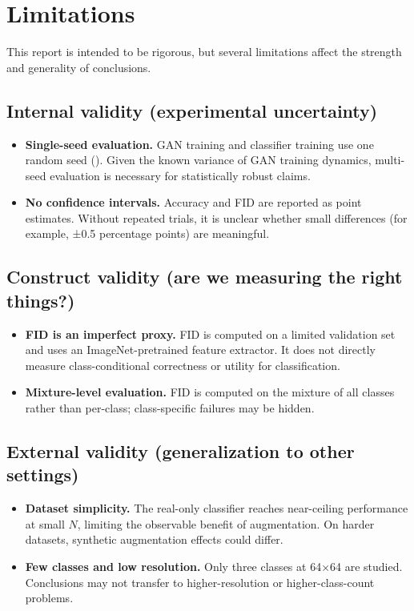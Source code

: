 \section{Limitations}

This report is intended to be rigorous, but several limitations affect the strength and generality of conclusions.

\subsection{Internal validity (experimental uncertainty)}

\begin{itemize}
\item \textbf{Single-seed evaluation.} GAN training and classifier training use one random seed (). Given the known variance of GAN training dynamics, multi-seed evaluation is necessary for statistically robust claims.
\item \textbf{No confidence intervals.} Accuracy and FID are reported as point estimates. Without repeated trials, it is unclear whether small differences (for example, ±0.5 percentage points) are meaningful.
\end{itemize}

\subsection{Construct validity (are we measuring the right things?)}

\begin{itemize}
\item \textbf{FID is an imperfect proxy.} FID is computed on a limited validation set and uses an ImageNet-pretrained feature extractor. It does not directly measure class-conditional correctness or utility for classification.
\item \textbf{Mixture-level evaluation.} FID is computed on the mixture of all classes rather than per-class; class-specific failures may be hidden.
\end{itemize}

\subsection{External validity (generalization to other settings)}

\begin{itemize}
\item \textbf{Dataset simplicity.} The real-only classifier reaches near-ceiling performance at small \(N\), limiting the observable benefit of augmentation. On harder datasets, synthetic augmentation effects could differ.
\item \textbf{Few classes and low resolution.} Only three classes at 64×64 are studied. Conclusions may not transfer to higher-resolution or higher-class-count problems.
\end{itemize}

